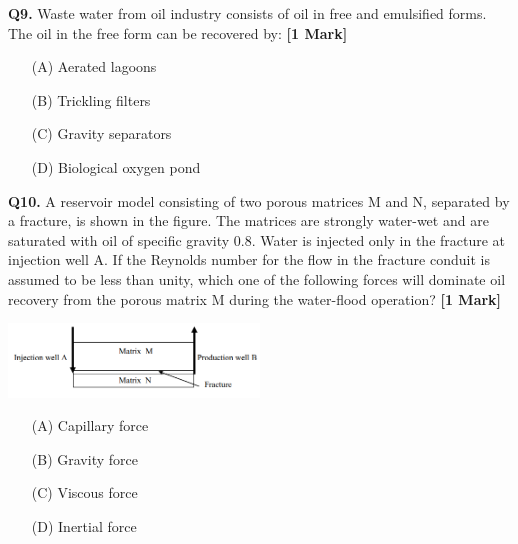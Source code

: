 \documentclass[11pt]{article}
\newcommand{\questiona}[2]{
    \noindent\textbf{Q#2.} #1 \hfill \textbf{[1 Mark]}
}
\begin{document}
\questiona{Waste water from oil industry consists of oil in free and emulsified forms. The oil in the free form can be recovered by:}{9}
\begin{enumerate}
    \item[(A)] Aerated lagoons  
    \item[(B)] Trickling filters  
    \item[(C)] Gravity separators  
    \item[(D)] Biological oxygen pond  
\end{enumerate}
\vspace{0.5cm}

\questiona{A reservoir model consisting of two porous matrices M and N, separated by a fracture, is shown in the figure. The matrices are strongly water-wet and are saturated with oil of specific gravity 0.8. Water is injected only in the fracture at injection well A. If the Reynolds number for the flow in the fracture conduit is assumed to be less than unity, which one of the following forces will dominate oil recovery from the porous matrix M during the water-flood operation?}{10}
\begin{center}
\includegraphics[width=0.5\textwidth]{figures/10.png}
\end{center}
\begin{enumerate}
    \item[(A)] Capillary force  
    \item[(B)] Gravity force  
    \item[(C)] Viscous force  
    \item[(D)] Inertial force  
\end{enumerate}
\vspace{0.5cm}
\end{document}
